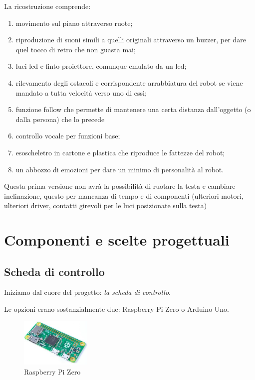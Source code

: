 \documentclass[12pt]{article}
\newcommand{\imgsz}{0.3\textwidth}
\newcommand{\raspi}{Raspberry Pi}
\newcommand{\raszero} {\raspi{} Zero}
\begin{document}
La ricostruzione comprende:
\begin{enumerate}
\item movimento sul piano attraverso ruote;
\item riproduzione di suoni simili a quelli originali attraverso un buzzer, per dare quel tocco di retro che non guasta mai;
\item luci led e finto proiettore, comunque emulato da un led;
\item rilevamento degli ostacoli e corrispondente arrabbiatura del robot se viene mandato a tutta velocità verso uno di essi;
\item funzione follow che permette di mantenere una certa distanza dall'oggetto (o dalla persona) che lo precede
\item controllo vocale per funzioni base;
\item esoscheletro in cartone e plastica che riproduce le fattezze del robot;
\item un abbozzo di emozioni per dare un minimo di personalità al robot.
\end{enumerate}

Questa prima versione non avrà la possibilità di ruotare la testa e cambiare inclinazione, questo per mancanza di tempo e di componenti (ulteriori motori, ulteriori driver, contatti girevoli per le luci posizionate sulla testa)
 
\section{Componenti e scelte progettuali}
\subsection{Scheda di controllo}
Iniziamo dal cuore del progetto: \emph{la scheda di controllo}.

Le opzioni erano sostanzialmente due: \raszero{} o Arduino Uno.

\begin{figure}[h]
\includegraphics[width=\imgsz]{rpi0}
\centering
\caption{\raszero}
\label{fig:rpi0}
\end{figure}
\end{document}
